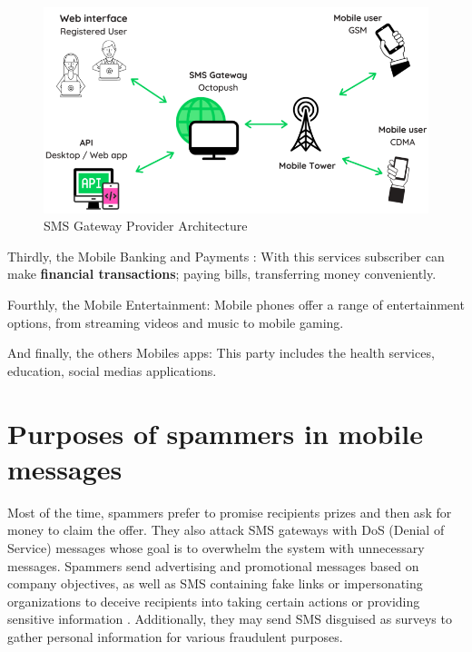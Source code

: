 \documentclass[12pt,a4paper]{report}
\begin{document}
\begin{figure}
	\centering
	\includegraphics[width=1\linewidth]{Images/SMSgateway}
	\caption{SMS Gateway Provider Architecture}
	\label{fig:smsgateway} 
\end{figure}
    
Thirdly, the Mobile Banking and Payments : With this services subscriber can make \textbf{financial transactions}; paying bills, transferring money conveniently. 

Fourthly, the Mobile Entertainment: Mobile phones offer a range of entertainment options, from streaming videos and music to mobile gaming. 

And finally, the others Mobiles apps: This party includes the health services, education, social medias applications.
\section{Purposes of spammers in mobile messages}
Most of the time, spammers prefer to promise recipients prizes and then ask for money to claim the offer. They also attack SMS gateways with DoS (Denial of Service) messages \cite{androulidakis2013fimess} whose goal is to overwhelm the system with unnecessary messages. Spammers send advertising and promotional messages based on company objectives, as well as SMS containing fake links or impersonating organizations to deceive recipients into taking certain actions or providing sensitive information \cite{tang2022clues}. Additionally, they may send SMS disguised as surveys to gather personal information for various fraudulent purposes.
\end{document}
